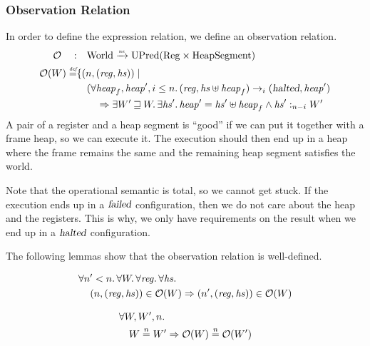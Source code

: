 \documentclass[a4paper]{article}
\newcommand{\nefun}{\xrightarrow{\textit{\tiny{ne}}}}
\newcommand{\defeq}{\stackrel{\textit{\tiny{def}}}{=}}
\newcommand{\nequal}[1][n]{\stackrel{\tiny{#1}}{=}}
\newcommand{\var}[1]{\mathit{#1}}
\newcommand{\hs}{\var{hs}}
\newcommand{\reg}{\var{reg}}
\newcommand{\heap}{\var{heap}}
\newcommand{\failed}{\textsl{failed}}
\newcommand{\halted}{\textsl{halted}}
\newcommand{\future}{\mathbin{\sqsupseteq}}
\newcommand{\heapSat}[3][\heap]{#1 :_{#2} #3}
\newcommand{\plaindom}[1]{\mathrm{#1}}
\newcommand{\Regs}{\plaindom{Reg}}
\newcommand{\HeapSegments}{\plaindom{HeapSegment}}
\newcommand{\Worlds}{\plaindom{World}}
\newcommand{\UPred}[1]{\plaindom{UPred}(#1)}
\newcommand{\observations}{\mathcal{O}}
\newcommand{\npair}[2][n]{\left(#1,#2 \right)}
\newcommand{\step}[1][]{\rightarrow_{#1}}
\begin{document}
\subsubsection{Observation Relation}
\label{subsubsec:observation-relation}
In order to define the expression relation, we define an observation relation.
\begin{align*}
  \observations \quad : & \quad  \Worlds \nefun \UPred{\Regs \times \HeapSegments} \\
  \observations (W) \defeq & \{ \npair{(\reg,\hs)} \mid \\
                           & \quad (\forall \heap_f, \heap', i \leq n \ldotp (\reg,\hs \uplus \heap_f) \step[i] (\halted,\heap')  \\
                           & \qquad \Rightarrow \exists W' \future W \ldotp\exists \hs' \ldotp \heap' = \hs' \uplus \heap_f \land \heapSat[\hs']{n-i}{W'}
\end{align*}
A pair of a register and a heap segment is ``good'' if we can put it together with a frame heap, so we can execute it. The execution should then end up in a heap where the frame remains the same and the remaining heap segment satisfies the world.

Note that the operational semantic is total, so we cannot get stuck. If the execution ends up in a $\failed$ configuration, then we do not care about the heap and the registers. This is why, we only have requirements on the result when we end up in a $\halted$ configuration.

The following lemmas show that the observation relation is well-defined.
\begin{lemma}
\label{lem:obs-dc}
  \begin{align*}
    &\forall n' < n \ldotp \forall W \ldotp \forall \reg \ldotp \forall \hs \ldotp\\
    &\quad \npair{(\reg,\hs)} \in \observations(W) \Rightarrow \npair[n']{(\reg,\hs)} \in \observations(W)
  \end{align*}
\end{lemma}

\begin{lemma}
\label{lem:obs-ne-worlds}
\begin{align*}
  &\forall W, W', n \ldotp \\
  &\quad W \nequal W' \Rightarrow \observations(W) \nequal \observations(W')
\end{align*}
\end{lemma}
\end{document}
